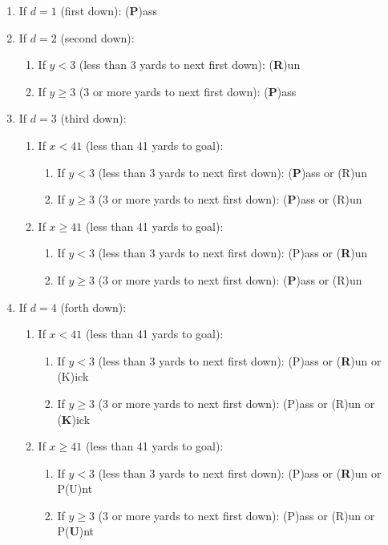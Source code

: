 \documentclass[11pt, oneside]{article}   	%
\begin{document}
\begin{enumerate}
\item If $d=1$ (first down): (\textbf{P})ass

\item If $d=2$ (second down):
\begin{enumerate}
\item If $y<3$ (less than 3 yards to next first down): (\textbf{R})un
\item If $y\geq3$ (3 or more yards to next first down): (\textbf{P})ass
\end{enumerate}

\item If $d=3$ (third down):
\begin{enumerate}
\item If $x<41$ (less than 41 yards to goal):
\begin{enumerate}
\item If $y<3$ (less than 3 yards to next first down): (\textbf{P})ass or (R)un
\item If $y\geq3$ (3 or more yards to next first down): (\textbf{P})ass or (R)un
\end{enumerate}
\item If $x \geq 41$ (less than 41 yards to goal):
\begin{enumerate}
\item If $y<3$ (less than 3 yards to next first down): (P)ass or (\textbf{R})un
\item If $y\geq3$ (3 or more yards to next first down): (\textbf{P})ass or (R)un
\end{enumerate}
\end{enumerate}

\item If $d=4$ (forth down):
\begin{enumerate}
\item If $x<41$ (less than 41 yards to goal):
\begin{enumerate}
\item If $y<3$ (less than 3 yards to next first down): (P)ass or (\textbf{R})un or (K)ick
\item If $y\geq3$ (3 or more yards to next first down): (P)ass or (R)un or (\textbf{K})ick
\end{enumerate}
\item If $x \geq 41$ (less than 41 yards to goal):
\begin{enumerate}
\item If $y<3$ (less than 3 yards to next first down): (P)ass or (\textbf{R})un or P(U)nt
\item If $y\geq3$ (3 or more yards to next first down): (P)ass or (R)un or P(\textbf{U})nt
\end{enumerate}
\end{enumerate}

\end{enumerate}
\end{document}
